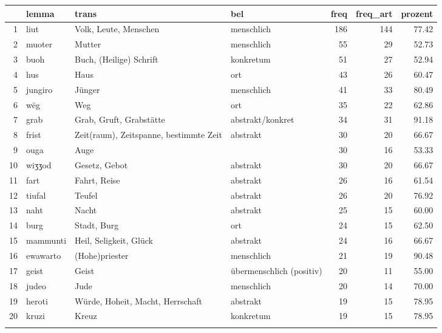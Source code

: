 \begin{tabular}{rlllrrr}
  \lsptoprule
 & lemma & trans & bel & freq & freq\_art & prozent \\ 
  \midrule
1 & liut & Volk, Leute, Menschen & menschlich & 186 & 144 & 77.42 \\ 
  2 & muoter & Mutter & menschlich &  55 &  29 & 52.73 \\ 
  3 & buoh & Buch, (Heilige) Schrift & konkretum &  51 &  27 & 52.94 \\ 
  4 & hus & Haus & ort &  43 &  26 & 60.47 \\ 
  5 & jungiro & Jünger & menschlich &  41 &  33 & 80.49 \\ 
  6 & wëg & Weg & ort &  35 &  22 & 62.86 \\ 
  7 & grab & Grab, Gruft, Grabstätte & abstrakt/konkret &  34 &  31 & 91.18 \\ 
  8 & frist & Zeit(raum), Zeitspanne, bestimmte Zeit & abstrakt &  30 &  20 & 66.67 \\ 
  9 & ouga & Auge &  &  30 &  16 & 53.33 \\ 
  10 & wiʒʒod & Gesetz, Gebot & abstrakt &  30 &  20 & 66.67 \\ 
  11 & fart & Fahrt, Reise & abstrakt &  26 &  16 & 61.54 \\ 
  12 & tiufal & Teufel & abstrakt &  26 &  20 & 76.92 \\ 
  13 & naht & Nacht & abstrakt &  25 &  15 & 60.00 \\ 
  14 & burg & Stadt, Burg & ort &  24 &  15 & 62.50 \\ 
  15 & mammunti & Heil, Seligkeit, Glück & abstrakt &  24 &  16 & 66.67 \\ 
  16 & ewawarto & (Hohe)priester & menschlich &  21 &  19 & 90.48 \\ 
  17 & geist & Geist & übermenschlich (positiv) &  20 &  11 & 55.00 \\ 
  18 & judeo & Jude & menschlich &  20 &  14 & 70.00 \\ 
  19 & heroti & Würde, Hoheit, Macht, Herrschaft & abstrakt &  19 &  15 & 78.95 \\ 
  20 & kruzi & Kreuz & konkretum &  19 &  15 & 78.95 \\ 
   \lspbottomrule
\end{tabular}
